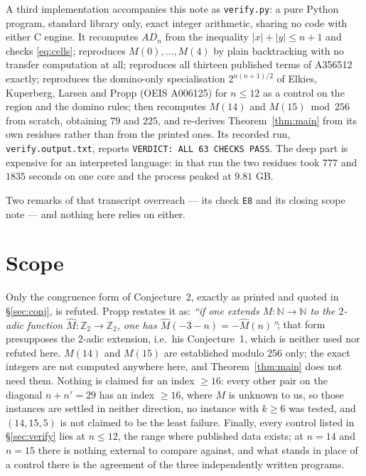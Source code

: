 \documentclass[11pt]{amsart}
\begin{document}
A third implementation accompanies this note as \texttt{verify.py}: a pure
Python program, standard library only, exact integer arithmetic, sharing no
code with either C engine. It recomputes $AD_n$ from the inequality
$|x|+|y|\le n+1$ and checks \eqref{eq:cells}; reproduces $M(0),\dots,M(4)$ by
plain backtracking with no transfer computation at all; reproduces all thirteen
published terms of A356512 exactly; reproduces the domino-only specialisation
$2^{n(n+1)/2}$ of Elkies, Kuperberg, Larsen and Propp \cite{EKLP}
(OEIS A006125) for $n\le12$ as a control on the region and the domino rules;
then recomputes $M(14)$ and $M(15) \bmod 256$ from scratch, obtaining $79$ and
$225$, and re-derives Theorem~\ref{thm:main} from its own residues rather than
from the printed ones. Its recorded run, \texttt{verify.output.txt}, reports
\texttt{VERDICT: ALL 63 CHECKS PASS}. The deep part is expensive for an
interpreted language: in that run the two residues took $777$ and $1835$
seconds on one core and the process peaked at $9.81$ GB.

Two remarks of that transcript overreach --- its check \texttt{E8} and its
closing scope note --- and nothing here relies on either.

\section{Scope}\label{sec:scope}

Only the congruence form of Conjecture~2, exactly as printed and quoted in
\S\ref{sec:conj}, is refuted. Propp restates it as: \emph{``if one extends
$M:\mathbb{N}\to\mathbb{N}$ to the $2$-adic function
$\widehat M:\mathbb{Z}_2\to\mathbb{Z}_2$, one has
$\widehat M(-3-n)=-\widehat M(n)$''}; that form presupposes the $2$-adic
extension, i.e.\ his Conjecture~1, which is neither used nor refuted here.
$M(14)$ and $M(15)$ are established modulo $256$ only; the exact integers are
not computed anywhere here, and Theorem~\ref{thm:main} does not need them.
Nothing is claimed for an index $\ge16$: every other pair on the diagonal
$n+n'=29$ has an index $\ge16$, where $M$ is unknown to us, so those instances
are settled in neither direction, no instance with $k\ge6$ was tested, and
$(14,15,5)$ is not claimed to be the least failure. Finally, every control
listed in \S\ref{sec:verify} lies at $n\le12$, the range where published data
exists; at $n=14$ and $n=15$ there is nothing external to compare against, and
what stands in place of a control there is the agreement of the three
independently written programs.
\end{document}
